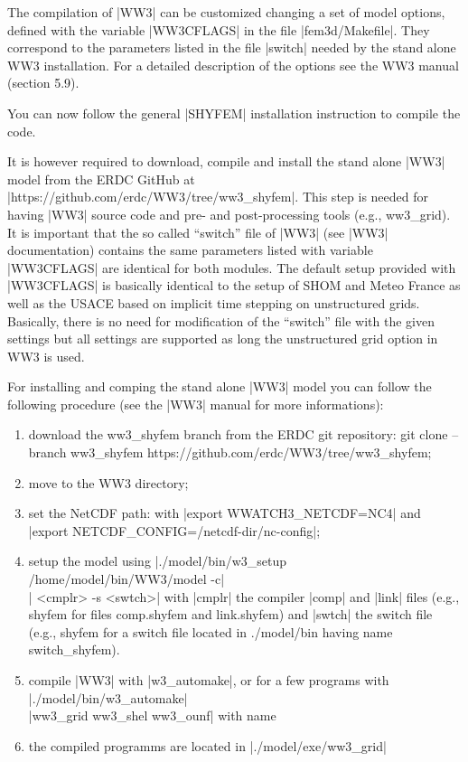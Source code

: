 The compilation of |WW3| can be customized changing a set of model options,
defined with the variable |WW3CFLAGS| in the file |fem3d/Makefile|. They
correspond to the parameters listed in the file |switch| needed by the stand 
alone WW3 installation. For a detailed description of the options see the WW3 
manual (section 5.9).

You can now follow the general |SHYFEM| installation instruction to compile the 
code.

It is however required to download, compile and install the stand alone |WW3| 
model from the ERDC GitHub at |https://github.com/erdc/WW3/tree/ww3_shyfem|. 
This step is needed for having |WW3| source code and pre- and post-processing 
tools (e.g., ww3\_grid). 
It is important that the so called ``switch'' file of |WW3| (see |WW3| documentation) 
contains the same parameters listed with variable |WW3CFLAGS| are identical 
for both modules. The default setup provided with |WW3CFLAGS| is basically 
identical to the setup of SHOM and Meteo France as well as the USACE based 
on implicit time stepping on unstructured grids. Basically, there is no need 
for modification of the ``switch'' file with the given settings but all 
settings are supported as long the unstructured grid option in WW3 is used.

For installing and comping the stand alone |WW3| model you can follow
the following procedure (see the |WW3| manual for more informations):
\begin{enumerate}
\item download the ww3\_shyfem branch from the ERDC git repository: 
git clone --branch ww3\_shyfem https://github.com/erdc/WW3/tree/ww3\_shyfem;
\item move to the WW3 directory;
\item set the NetCDF path: with |export WWATCH3_NETCDF=NC4| and \\
|export NETCDF_CONFIG=/netcdf-dir/nc-config|;
\item setup the model using |./model/bin/w3_setup /home/model/bin/WW3/model -c| \\
| <cmplr> -s <swtch>| with |cmplr| the compiler |comp| and |link| files (e.g., shyfem
for files comp.shyfem and link.shyfem) and |swtch| the switch file (e.g., shyfem 
for a switch file located in ./model/bin having name switch\_shyfem).
\item compile |WW3| with |w3_automake|, or for a few programs with
|./model/bin/w3_automake| \\ |ww3_grid ww3_shel ww3_ounf| with name 
\item the compiled programms are located in |./model/exe/ww3_grid|
\end{enumerate}

